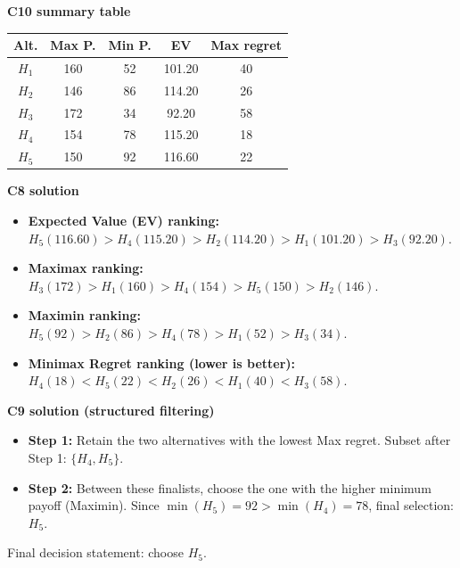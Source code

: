\begin{ExamProblems}
		\textbf{C10 summary table}
		\begin{center}
			\begin{tabular}{c c c c c}
				\toprule
				Alt. & Max P. & Min P. & EV & Max regret \\
				\midrule
				$H_1$ & 160 & 52 & 101.20 & 40 \\
				$H_2$ & 146 & 86 & 114.20 & 26 \\
				$H_3$ & 172 & 34 & 92.20 & 58 \\
				$H_4$ & 154 & 78 & 115.20 & 18 \\
				$H_5$ & 150 & 92 & 116.60 & 22 \\
				\bottomrule
			\end{tabular}
		\end{center}

		\textbf{C8 solution}
		\begin{itemize}
			\item \textbf{Expected Value (EV) ranking:} $H_5(116.60)>H_4(115.20)>H_2(114.20)>H_1(101.20)>H_3(92.20)$.
			\item \textbf{Maximax ranking:} $H_3(172)>H_1(160)>H_4(154)>H_5(150)>H_2(146)$.
			\item \textbf{Maximin ranking:} $H_5(92)>H_2(86)>H_4(78)>H_1(52)>H_3(34)$.
			\item \textbf{Minimax Regret ranking (lower is better):} $H_4(18)<H_5(22)<H_2(26)<H_1(40)<H_3(58)$.
		\end{itemize}

		\textbf{C9 solution (structured filtering)}
		\begin{itemize}
			\item \textbf{Step 1:} Retain the two alternatives with the lowest Max regret. Subset after Step 1: $\{H_4,H_5\}$.
			\item \textbf{Step 2:} Between these finalists, choose the one with the higher minimum payoff (Maximin). Since $\min(H_5)=92>\min(H_4)=78$, final selection: $H_5$.
		\end{itemize}
		Final decision statement: choose $H_5$.

		\newpage
		\item

\end{ExamProblems}
